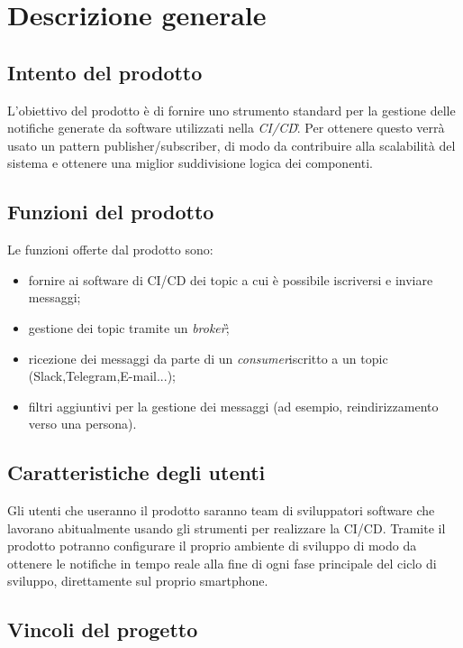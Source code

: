 \section{Descrizione generale}

	\subsection{Intento del prodotto}
    
    L'obiettivo del prodotto è di fornire uno strumento standard per la gestione delle notifiche generate da software utilizzati nella \textit{CI/CD}\G.
    Per ottenere questo verrà usato un pattern publisher/subscriber, di modo da contribuire alla scalabilità del sistema e ottenere una miglior suddivisione logica dei componenti.
	
	\subsection{Funzioni del prodotto}
	
    Le funzioni offerte dal prodotto sono:
    \begin{itemize}
		\item fornire ai software di CI/CD dei topic a cui è possibile iscriversi e inviare messaggi;
		\item gestione dei topic tramite un \textit{broker}\G;
        \item ricezione dei messaggi da parte di un \textit{consumer}\GAlt iscritto a un topic (Slack,Telegram,E-mail...);
        \item filtri aggiuntivi per la gestione dei messaggi (ad esempio, reindirizzamento verso una persona).
	\end{itemize}

	\subsection{Caratteristiche degli utenti}
    
    Gli utenti che useranno il prodotto saranno team di sviluppatori software che lavorano abitualmente usando gli strumenti per realizzare la CI/CD.
    Tramite il prodotto potranno configurare il proprio ambiente di sviluppo di modo da ottenere le notifiche in tempo reale alla fine di ogni fase principale del ciclo di sviluppo, direttamente sul proprio smartphone.
	
	\subsection{Vincoli del progetto}
	
